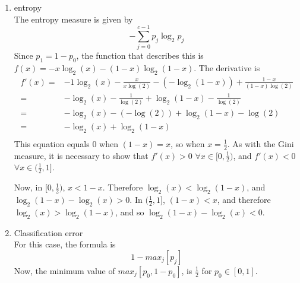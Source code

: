 \documentclass[11pt]{article}
\begin{document}
\begin{enumerate}
\begin{enumerate}
                 Which is equal to $$1 - p_0^2 - (1 - p_0^2) = 1 - p_0^2 - 1 + 2p_0 - p_0^2$$
                 On the interval $[0, 1]$, the derivative of the function $$ f(x) = 2(x - x^2)$$
                 is equal to 0 when $2(1 - 2x) = 0$. That is, $x = \frac{1}{2}$. The only thing to check now is whether $f'(x)$ is 
                 positive on $[0, \frac{1}{2})$, and negative on $(\frac{1}{2}, 1]$. On $[0, \frac{1}{2}]$, the quantity $2x$ is always 
                 less than 1, and so $2(1 - 2x) > 0$. On $(\frac{1}{2}, 1]$, $2x > 1$, and so $2(1 - 2x) < 0$. Thus the maximum value 
                 is always achieved at $p_0 = \frac{1}{2}$, and $p_1 = 1 - p_0 = 1 - \frac{1}{2} = \frac{1}{2}$.
            \item entropy\\
                 The entropy measure is given by $$ -\sum\limits_{j = 0}^{c - 1} p_j \log_2 p_j$$
                 Since $p_1 = 1 - p_0$, the function that describes this is $f(x) =  - x \log_2(x) - (1 - x)\log_2(1 - x)$.
                 The derivative is 
                 \begin{equation}
                   \begin{array}{rl}
                      f'(x) = &-1\log_2(x) - \frac{x}{x\log(2)} - (-\log_2(1 - x)) + \frac{1 - x}{(1 - x) \log(2)}\\
                            = &-\log_2(x) - \frac{1}{\log(2)} + \log_2(1 - x) - \frac{1}{\log(2)}\\
                            = &-\log_2(x) - (-\log(2)) + \log_2(1 - x) - \log(2)\\
                            = &-\log_2(x) + \log_2(1 - x)\\
                   \end{array}
                 \end{equation}
                 This equation equals 0 when $(1 - x) = x$, so when $x = \frac{1}{2}$. As with the Gini measure, it is necessary to show 
                 that $f'(x) > 0$ $ \forall x \in [0, \frac{1}{2})$, and $f'(x) < 0$ $ \forall x \in (\frac{1}{2}, 1]$. 

                 Now, in $[0, \frac{1}{2})$, $x < 1 - x$. Therefore $\log_2(x) < \log_2(1 - x)$, and 
                 $\log_2(1 - x) - \log_2(x) > 0$.
                 In $(\frac{1}{2}, 1]$, $(1 - x) < x$, and therefore $\log_2(x) > \log_2(1 - x)$, and so $\log_2(1 - x) - \log_2(x) < 0$.
            \item Classification error\\
                 For this case, the formula is $$ 1 - max_j[p_j]$$ Now, the minimum value of $max_j[p_0, 1 - p_0]$, is $\frac{1}{2}$ for 
                 $p_0 \in [0, 1]$. 


\end{enumerate}
\end{enumerate}
\end{document}
